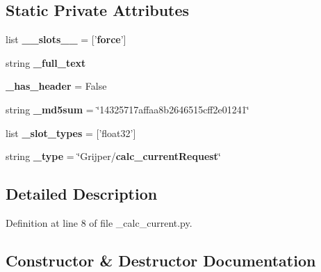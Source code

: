 \subsection*{Static Private Attributes}
\begin{DoxyCompactItemize}
\item 
list {\bf \-\_\-\-\_\-slots\-\_\-\-\_\-} = ['{\bf force}']
\item 
string {\bf \-\_\-full\-\_\-text}
\item 
{\bf \-\_\-has\-\_\-header} = False
\item 
string {\bf \-\_\-md5sum} = \char`\"{}14325717affaa8b2646515cff2e01241\char`\"{}
\item 
list {\bf \-\_\-slot\-\_\-types} = ['float32']
\item 
string {\bf \-\_\-type} = \char`\"{}Grijper/{\bf calc\-\_\-current\-Request}\char`\"{}
\end{DoxyCompactItemize}


\subsection{Detailed Description}


Definition at line 8 of file \-\_\-calc\-\_\-current.\-py.



\subsection{Constructor \& Destructor Documentation}
